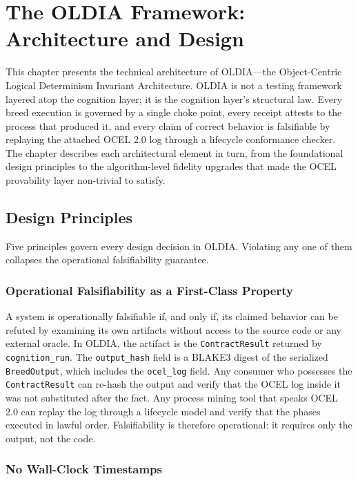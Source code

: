 \chapter{The OLDIA Framework: Architecture and Design}
\label{ch:framework}

This chapter presents the technical architecture of OLDIA---the Object-Centric Logical Determinism Invariant Architecture. OLDIA is not a testing framework layered atop the cognition layer; it is the cognition layer's structural law. Every breed execution is governed by a single choke point, every receipt attests to the process that produced it, and every claim of correct behavior is falsifiable by replaying the attached OCEL 2.0 log through a lifecycle conformance checker. The chapter describes each architectural element in turn, from the foundational design principles to the algorithm-level fidelity upgrades that made the OCEL provability layer non-trivial to satisfy.

\section{Design Principles}
\label{sec:design-principles}

Five principles govern every design decision in OLDIA. Violating any one of them collapses the operational falsifiability guarantee.

\subsection{Operational Falsifiability as a First-Class Property}

A system is operationally falsifiable if, and only if, its claimed behavior can be refuted by examining its own artifacts without access to the source code or any external oracle. In OLDIA, the artifact is the \texttt{ContractResult} returned by \texttt{cognition\_run}. The \texttt{output\_hash} field is a BLAKE3 digest of the serialized \texttt{BreedOutput}, which includes the \texttt{ocel\_log} field. Any consumer who possesses the \texttt{ContractResult} can re-hash the output and verify that the OCEL log inside it was not substituted after the fact. Any process mining tool that speaks OCEL 2.0 can replay the log through a lifecycle model and verify that the phases executed in lawful order. Falsifiability is therefore operational: it requires only the output, not the code.

\subsection{No Wall-Clock Timestamps}

